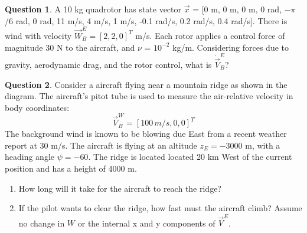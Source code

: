 \documentclass{article}
\theoremstyle{definition}
\newtheorem{question}{Question}
\begin{document}
\begin{question}
    A 10 kg quadrotor has state vector $\vec{x}$ = [0 m, 0 m, 0 m, 0 rad, $-\pi$/6 rad, 0 rad, 11 m/s, 4 m/s, 1 m/s, -0.1 rad/s, 0.2 rad/s, 0.4 rad/s]. There is wind with velocity $\vec{W}_B^E = [2,2,0]^T$ m/s. Each rotor applies a control force of magnitude 30 N to the aircraft, and $\nu$ = $10^{-2}$ kg/m. Considering forces due to gravity, aerodynamic drag, and the rotor control, what is $\dot{\vec{V}}_B^E$?
\end{question}
\vspace{0.1cm}

\clearpage

\begin{question}
    Consider a aircraft flying near a mountain ridge as shown in the diagram. The aircraft's pitot tube is used to measure the air-relative velocity in body coordinates:
     \[ \vec{V}^W_B = [100 \, m/s, 0, 0]^T \]
    The background wind is known to be blowing due East from a recent weather report at 30 m/s. The aircraft is flying at an altitude $z_E = -3000$ m, with a heading angle $\psi = -60$\textdegree{}. The ridge is located located 20 km West of the current position and has a height of 4000 m. 

    
    
\begin{enumerate}[label=(\alph*)]
    \item How long will it take for the aircraft to reach the ridge?
    \item If the pilot wants to clear the ridge, how fast must the aircraft climb? Assume no change in $W$ or the internal x and y components of $\vec{V}^E$.
\end{enumerate}
\end{question}
\vspace{0.1cm}
\end{document}
